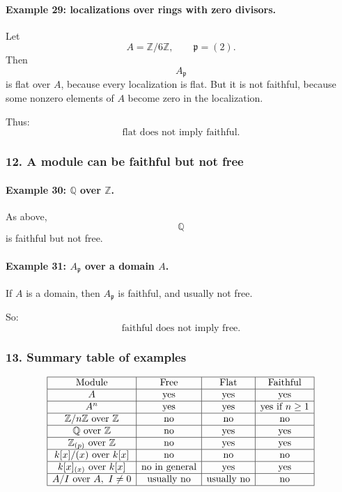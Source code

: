 \documentclass[12pt,a4paper]{article}
\theoremstyle{notespace}
\theoremstyle{definition}
\begin{document}
\paragraph{Example 29: localizations over rings with zero divisors.}

Let
\[
A=\mathbb Z/6\mathbb Z,
\qquad
\mathfrak p=(2).
\]
Then
\[
A_{\mathfrak p}
\]
is flat over \(A\), because every localization is flat. But it is not faithful, because some nonzero elements of \(A\) become zero in the localization.

Thus:
\[
\text{flat does not imply faithful.}
\]

\subsubsection{12. A module can be faithful but not free}

\paragraph{Example 30: \(\mathbb Q\) over \(\mathbb Z\).}

As above,
\[
\mathbb Q
\]
is faithful but not free.

\paragraph{Example 31: \(A_{\mathfrak p}\) over a domain \(A\).}

If \(A\) is a domain, then \(A_{\mathfrak p}\) is faithful, and usually not free.

So:
\[
\text{faithful does not imply free.}
\]

\subsubsection{13. Summary table of examples}

\[
\begin{array}{|c|c|c|c|}
	\hline
	\text{Module} & \text{Free} & \text{Flat} & \text{Faithful} \\
	\hline
	A & \text{yes} & \text{yes} & \text{yes} \\
	\hline
	A^n & \text{yes} & \text{yes} & \text{yes if } n\ge 1 \\
	\hline
	\mathbb Z/n\mathbb Z \text{ over } \mathbb Z & \text{no} & \text{no} & \text{no} \\
	\hline
	\mathbb Q \text{ over } \mathbb Z & \text{no} & \text{yes} & \text{yes} \\
	\hline
	\mathbb Z_{(p)} \text{ over } \mathbb Z & \text{no} & \text{yes} & \text{yes} \\
	\hline
	k[x]/(x) \text{ over } k[x] & \text{no} & \text{no} & \text{no} \\
	\hline
	k[x]_{(x)} \text{ over } k[x] & \text{no in general} & \text{yes} & \text{yes} \\
	\hline
	A/I \text{ over } A,\ I\neq 0 & \text{usually no} & \text{usually no} & \text{no} \\
	\hline
\end{array}
\]
\end{document}
